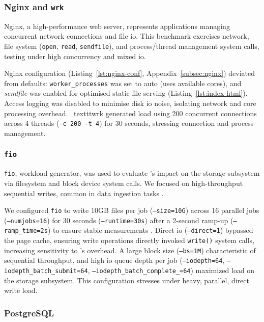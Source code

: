 \subsubsection{Nginx and \texttt{wrk}}\label{subsubsec:nginx-just}

Nginx, a high-performance web server, represents applications managing concurrent network connections and file \ac{io}. This benchmark exercises network, file system (\texttt{open}, \texttt{read}, \texttt{sendfile}), and process/thread management system calls, testing \af under high concurrency and mixed \ac{io}.

Nginx configuration (Listing~\ref{lst:nginx-conf}, Appendix~\ref{subsec:nginx})
deviated from defaults: \texttt{worker\_processes} was set to auto (uses
available cores), and \textit{sendfile} was enabled for optimised static
file serving (Listing~\ref{lst:index-html}). Access logging was disabled to
minimise disk \ac{io} noise, isolating network and core processing overhead. \
texttt{wrk} generated load using 200 concurrent connections across 4 threads
(\texttt{-c 200 -t 4}) for 30 seconds, stressing connection and process management.

\subsubsection{\texttt{fio}}\label{subsubsec:fio-just}
\texttt{fio},  workload generator, was used to evaluate \af's impact
on the storage subsystem via filesystem and block device system calls. We
focused on high-throughput sequential writes, common in data ingestion tasks
\cite{WRITES_ARE_SEQUENTIAL}.

We configured \texttt{fio} to write 10GB files per job (\texttt{--size=10G})
across 16 parallel jobs (\texttt{--numjobs=16}) for 30 seconds
(\texttt{--runtime=30s}) after a 2-second ramp-up (\texttt{--ramp\_time=2s}) to
ensure stable measurements \cite{fio-docs}. Direct \ac{io} (\texttt{--direct=1})
bypassed the \acg{os} page cache, ensuring write operations directly invoked
\texttt{write()} system calls, increasing sensitivity to \af's overhead. A large
block size (\texttt{--bs=1M}) characteristic of sequential throughput, and high
\ac{io} queue depth per job (\texttt{--iodepth=64},
\texttt{--iodepth\_batch\_submit=64}, \texttt{--iodepth\_batch\_complete\_=64})
maximized load on the storage subsystem. This configuration stresses \af under 
heavy, parallel, direct write load.

\subsubsection{PostgreSQL}\label{subsubsec:psql-just}

